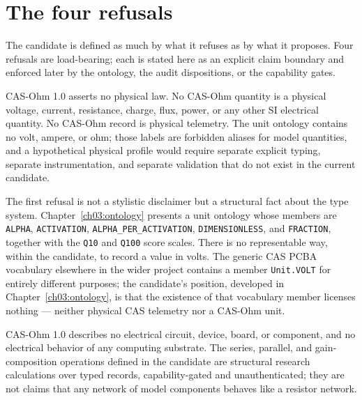 \section{The four refusals}\label{ch01:refuse}

The candidate is defined as much by what it refuses as by what it proposes. Four refusals are load-bearing; each is stated here as an explicit claim boundary and enforced later by the ontology, the audit dispositions, or the capability gates.

\begin{boundary}\label{ch01:bd:physical}
CAS-Ohm 1.0 asserts no physical law. No CAS-Ohm quantity is a physical voltage, current, resistance, charge, flux, power, or any other SI electrical quantity. No CAS-Ohm record is physical telemetry. The unit ontology contains no volt, ampere, or ohm; those labels are forbidden aliases for model quantities, and a hypothetical physical profile would require separate explicit typing, separate instrumentation, and separate validation that do not exist in the current candidate.
\end{boundary}

The first refusal is not a stylistic disclaimer but a structural fact about the type system. Chapter~\ref{ch03:ontology} presents a unit ontology whose members are \texttt{ALPHA}, \texttt{ACTIVATION}, \texttt{ALPHA\_PER\_ACTIVATION}, \texttt{DIMENSIONLESS}, and \texttt{FRACTION}, together with the \texttt{Q10} and \texttt{Q100} score scales. There is no representable way, within the candidate, to record a value in volts. The generic CAS PCBA vocabulary elsewhere in the wider project contains a member \texttt{Unit.VOLT} for entirely different purposes; the candidate's position, developed in Chapter~\ref{ch03:ontology}, is that the existence of that vocabulary member licenses nothing --- neither physical CAS telemetry nor a CAS-Ohm unit.

\begin{boundary}\label{ch01:bd:electrical}
CAS-Ohm 1.0 describes no electrical circuit, device, board, or component, and no electrical behavior of any computing substrate. The series, parallel, and gain-composition operations defined in the candidate are structural research calculations over typed records, capability-gated and unauthenticated; they are not claims that any network of model components behaves like a resistor network.
\end{boundary}

